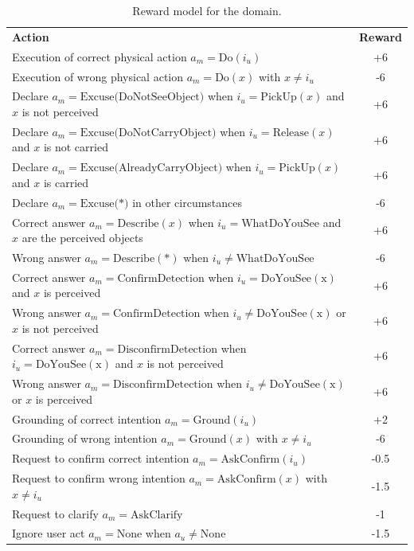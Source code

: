 \begin{table}[h]
\begin{center}
\begin{footnotesize}
\begin{tabular}{p{130mm}c} 
\centering \textbf{Action} & \textbf{Reward} \\
Execution of correct physical action $a_m\!=\!\mathrm{Do}(i_u)$ & +6 \\
Execution of wrong physical action $a_m\!=\!\mathrm{Do}(x)$ with $x\!\neq\!i_u$ & -6  \\
Declare $a_m\!=\!\mathrm{Excuse(DoNotSeeObject})$ when $i_u\!=\!\mathrm{PickUp}(x)$ and $x$ is not perceived & +6 \\
Declare $a_m\!=\!\mathrm{Excuse(DoNotCarryObject})$ when $i_u\!=\!\mathrm{Release}(x)$ and $x$ is not carried & +6 \\
Declare $a_m\!=\!\mathrm{Excuse(AlreadyCarryObject})$ when $i_u\!=\!\mathrm{PickUp}(x)$ and $x$ is carried & +6 \\
Declare $a_m\!=\!\mathrm{Excuse(*})$ in other circumstances & -6 \\
Correct answer $a_m\!=\!\mathrm{Describe}(x)$ when $i_u\!=\!\mathrm{WhatDoYouSee}$ and $x$ are the perceived objects & +6 \\
Wrong answer $a_m\!=\!\mathrm{Describe}(*)$ when $i_u\!\neq\!\mathrm{WhatDoYouSee}$ & -6 \\
Correct answer $a_m\!=\!\mathrm{ConfirmDetection}$ when $i_u\!=\!\mathrm{DoYouSee(x)}$ and $x$ is perceived & +6 \\
Wrong answer $a_m\!=\!\mathrm{ConfirmDetection}$ when $i_u\!\neq\!\mathrm{DoYouSee(x)}$ or $x$ is not perceived & +6 \\
Correct answer $a_m\!=\!\mathrm{DisconfirmDetection}$ when $i_u\!=\!\mathrm{DoYouSee(x)}$ and $x$ is not perceived & +6 \\
Wrong answer $a_m\!=\!\mathrm{DisconfirmDetection}$ when $i_u\!\neq\!\mathrm{DoYouSee(x)}$ or $x$ is perceived & +6 \\
Grounding of correct intention $a_m\!=\!\mathrm{Ground}(i_u)$ & +2 \\
Grounding of wrong intention  $a_m\!=\!\mathrm{Ground}(x)$ with $x\!\neq\!i_u$ & -6  \\ 
Request to confirm correct intention $a_m\!=\!\mathrm{AskConfirm}(i_u)$ & -0.5 \\
Request to confirm wrong intention  $a_m\!=\!\mathrm{AskConfirm}(x)$ with $x\!\neq\!i_u$ & -1.5  \\ 
Request to clarify $a_m\!=\!\mathrm{AskClarify}$ & -1 \\
Ignore user act $a_m\!=\!\mathrm{None}$ when $a_u\!\neq\!\mathrm{None}$ & -1.5 
\end{tabular}
\end{footnotesize}
\end{center}  
\caption{Reward model for the domain.} 
\label{table:rewards}
\end{table}


